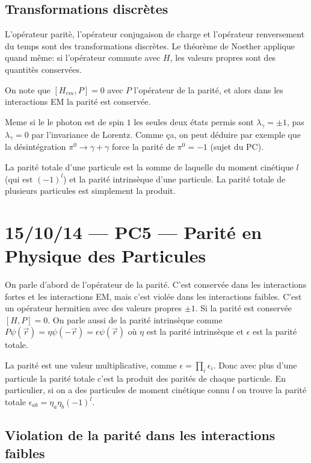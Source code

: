 \documentclass[10pt]{report}
\begin{document}
\section{Transformations discr\`etes}

L'op\'erateur parit\`e, l'op\'erateur conjugaison de charge et l'op\'erateur renversement du temps sont des transformations discr\`etes. Le th\'eor\`eme de Noether applique quand m\^eme: si l'op\'erateur commute avec $H$, les valeurs propres sont des quantit\`es conserv\'ees. 

On note que $\left[ H_{em},P \right] = 0$ avec $P$ l'op\'erateur de la parit\'e, et alors dans les interactions EM la parit\'e est conserv\'ee.

Meme si le le photon est de spin $1$ les seules deux \'etats permis sont $\lambda_\gamma = \pm 1$, pas $\lambda_\gamma = 0$ par l'invariance de Lorentz. Comme \c{c}a, on peut d\'eduire par exemple que la d\'esint\'egration $\pi^0 \to \gamma + \gamma$ force la parit\'e de $\pi^0 = -1$ (sujet du PC). 

La parit\'e totale d'une particule est la somme de laquelle du moment cin\'etique $l$ (qui est $(-1)^l$) et la parit\'e intrins\`eque d'une particule. La parit\'e totale de plusieurs particules est simplement la produit.
\chapter{15/10/14 --- PC5 --- Parit\'e en Physique des Particules}

On parle d'abord de l'op\'erateur de la parit\'e. C'est conserv\'ee dans les interactions fortes et les interactions EM, mais c'est viol\'ee dans les interactions faibles. C'est un op\'erateur hermitien avec des valeurs propres $\pm 1$. Si la parit\'e est conserv\'ee $\left[ H,P \right] = 0$. On parle aussi de la parit\'e intrins\`eque comme $P\psi(\vec{r}) = \eta\psi(-\vec{r}) = \epsilon \psi(\vec{r})$ o\`u $\eta$ est la parit\'e intrins\`eque et $\epsilon$ est la parit\'e totale.

La parit\'e est une valeur multiplicative, comme $\epsilon = \prod_i \epsilon_i$. Donc avec plus d'une particule la parit\'e totale c'est la produit des parit\'es de chaque particule. En particulier, si on a des particules de moment cin\'etique connu $l$ on trouve la parit\'e totale $\epsilon_{ab} = \eta_a\eta_b(-1)^l$.

\section{Violation de la parit\'e dans les interactions faibles}
\end{document}
